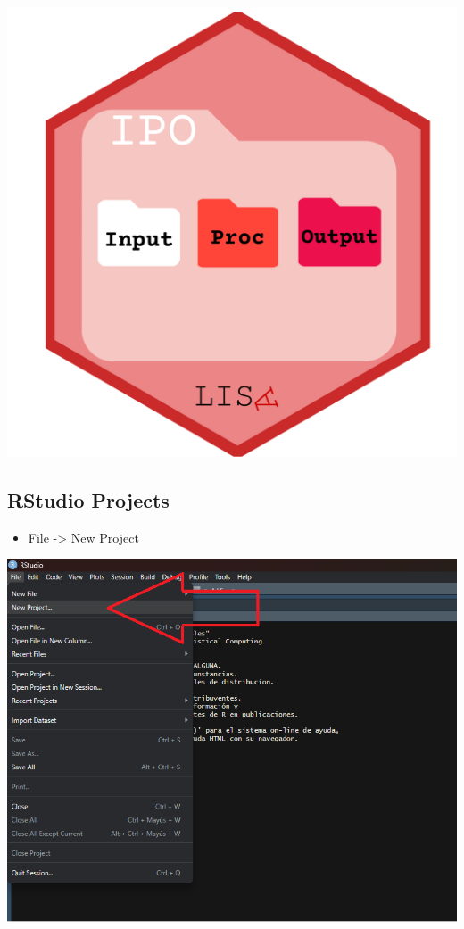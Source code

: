 \documentclass[
  letterpaper,
  DIV=11,
  numbers=noendperiod]{scrartcl}
\providecommand{\tightlist}{%
  \setlength{\itemsep}{0pt}\setlength{\parskip}{0pt}}\usepackage{longtable,booktabs,array}
\begin{document}
\includegraphics{images/ipo-hex.png}

\subsection{RStudio Projects}\label{rstudio-projects}

\begin{itemize}
\tightlist
\item
  File -\textgreater{} New Project
\end{itemize}

\includegraphics{images/project.png}
\end{document}
